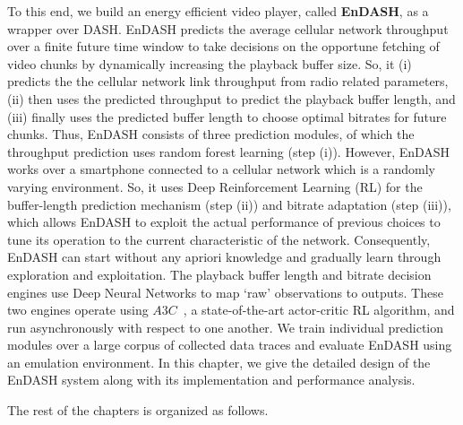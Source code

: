 To this end, we build an energy efficient video player, called {\bf EnDASH}, as a wrapper over \ac{DASH}. EnDASH predicts the average cellular network throughput over a finite future time window to take decisions on the opportune fetching of video chunks by dynamically increasing the playback buffer size. So, it (i) predicts the the cellular network link throughput from radio related parameters, (ii) then uses the predicted throughput to predict the playback buffer length, and (iii) finally uses the predicted buffer length to choose optimal bitrates for future chunks. Thus, EnDASH consists of three prediction modules, of which the throughput prediction uses random forest learning (step (i)). However, EnDASH works over a smartphone connected to a cellular network which is a randomly varying environment. So, it uses Deep Reinforcement Learning (RL) for the buffer-length prediction mechanism (step (ii)) and bitrate adaptation (step (iii)), which allows EnDASH to exploit the actual performance of previous choices to tune its operation to the current characteristic of the network.  Consequently, EnDASH can start without any apriori knowledge and gradually learn through exploration and exploitation.  The playback buffer length and bitrate decision engines use Deep Neural Networks to map `raw' observations to outputs. These two engines operate using $A3C$~\cite{mao2017neural}, a state-of-the-art actor-critic RL algorithm, and run asynchronously with respect to one another. We train individual prediction modules over a large corpus of collected data traces and evaluate EnDASH using an emulation environment. In this chapter, we give the detailed design of the EnDASH system along with its implementation and performance analysis. 

The rest of the chapters is organized as follows. 


